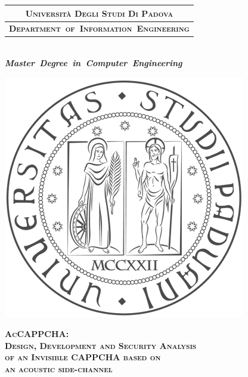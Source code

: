 \addtolength{\oddsidemargin}{-0.7cm}
\begin{titlepage} %
\begin{center}
\begin{minipage}{\textwidth}
\begin{center}
  \begin{table}[H]
  \centering  
  \begin{tabular}{p{\textwidth}}
  \multicolumn{1}{c}{\scshape{\bfseries{\large{Università Degli Studi Di Padova}}}}\\
  \hline
  \multicolumn{1}{c}{\scshape{\bfseries{\large{Department~of~Information~Engineering}}}}\\
  \end{tabular}
  \end{table}
\end{center}
\end{minipage}\\
\large{\textit{\textbf{Master~Degree~in~Computer~Engineering}}} \\
\vspace{0.5cm}
\begin{minipage}{.25\textwidth}
  \includegraphics[width=\textwidth]{./Images/unipd-bn}
\end{minipage}

\vspace{1.0cm}
\scshape{\Large{\bfseries{AcCAPPCHA:\\}}}
\scshape{\large{\bfseries{Design, Development and Security Analysis\\}}}
\scshape{\large{\bfseries{of an Invisible CAPPCHA based on\\}}}
\scshape{\large{\bfseries{an acoustic side-channel\\}}}
\vspace{0.2cm} \linespread{1} 
\scshape{\large{\bfseries{}}}
\end{center}


\end{titlepage}
